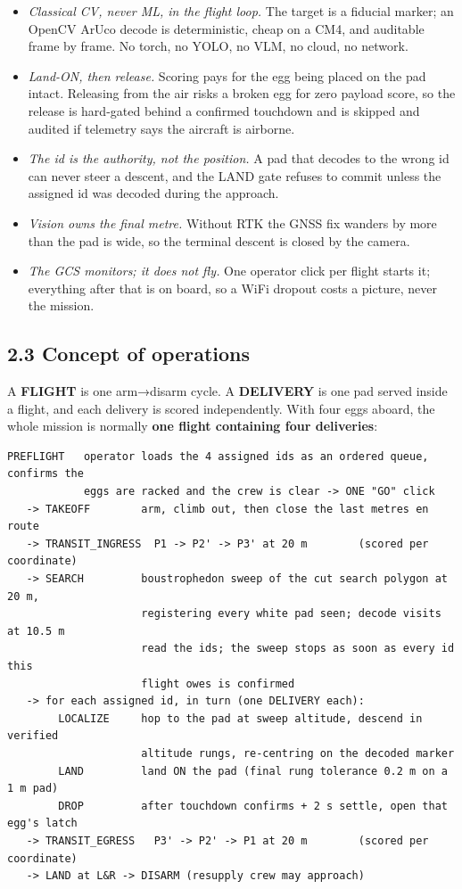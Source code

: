\documentclass[
  10pt,
  a4paper,
  titlepage]{article}
\providecommand{\tightlist}{%
  \setlength{\itemsep}{0pt}\setlength{\parskip}{0pt}}
\begin{document}
\begin{itemize}
\tightlist
\item
  \emph{Classical CV, never ML, in the flight loop.} The target is a
  fiducial marker; an OpenCV ArUco decode is deterministic, cheap on a
  CM4, and auditable frame by frame. No torch, no YOLO, no VLM, no
  cloud, no network.
\item
  \emph{Land-ON, then release.} Scoring pays for the egg being placed on
  the pad intact. Releasing from the air risks a broken egg for zero
  payload score, so the release is hard-gated behind a confirmed
  touchdown and is skipped and audited if telemetry says the aircraft is
  airborne.
\item
  \emph{The id is the authority, not the position.} A pad that decodes
  to the wrong id can never steer a descent, and the LAND gate refuses
  to commit unless the assigned id was decoded during the approach.
\item
  \emph{Vision owns the final metre.} Without RTK the GNSS fix wanders
  by more than the pad is wide, so the terminal descent is closed by the
  camera.
\item
  \emph{The GCS monitors; it does not fly.} One operator click per
  flight starts it; everything after that is on board, so a WiFi dropout
  costs a picture, never the mission.
\end{itemize}

\hypertarget{concept-of-operations}{%
\subsection{2.3 Concept of operations}\label{concept-of-operations}}

A \textbf{FLIGHT} is one arm→disarm cycle. A \textbf{DELIVERY} is one
pad served inside a flight, and each delivery is scored independently.
With four eggs aboard, the whole mission is normally \textbf{one flight
containing four deliveries}:

\begin{verbatim}
PREFLIGHT   operator loads the 4 assigned ids as an ordered queue, confirms the
            eggs are racked and the crew is clear -> ONE "GO" click
   -> TAKEOFF        arm, climb out, then close the last metres en route
   -> TRANSIT_INGRESS  P1 -> P2' -> P3' at 20 m        (scored per coordinate)
   -> SEARCH         boustrophedon sweep of the cut search polygon at 20 m,
                     registering every white pad seen; decode visits at 10.5 m
                     read the ids; the sweep stops as soon as every id this
                     flight owes is confirmed
   -> for each assigned id, in turn (one DELIVERY each):
        LOCALIZE     hop to the pad at sweep altitude, descend in verified
                     altitude rungs, re-centring on the decoded marker
        LAND         land ON the pad (final rung tolerance 0.2 m on a 1 m pad)
        DROP         after touchdown confirms + 2 s settle, open that egg's latch
   -> TRANSIT_EGRESS   P3' -> P2' -> P1 at 20 m        (scored per coordinate)
   -> LAND at L&R -> DISARM (resupply crew may approach)
\end{verbatim}
\end{document}
